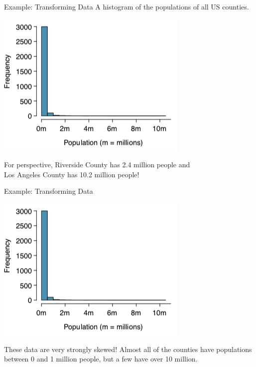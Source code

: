 \begin{frame}{Example: Transforming Data}
    A histogram of the populations of all US counties.
    \begin{center}
        \includegraphics[scale=0.5]{images/trans1.png}
    \end{center}
    For perspective, Riverside County has 2.4 million people and \\ Los Angeles County has 10.2 million people!
\end{frame}

\begin{frame}{Example: Transforming Data}
    \begin{center}
        \includegraphics[scale=0.5]{images/trans1.png}
    \end{center}
    
    These data are very strongly skewed! Almost all of the counties have populations between 0 and 1 million people, but a few have over 10 million.
\end{frame}


